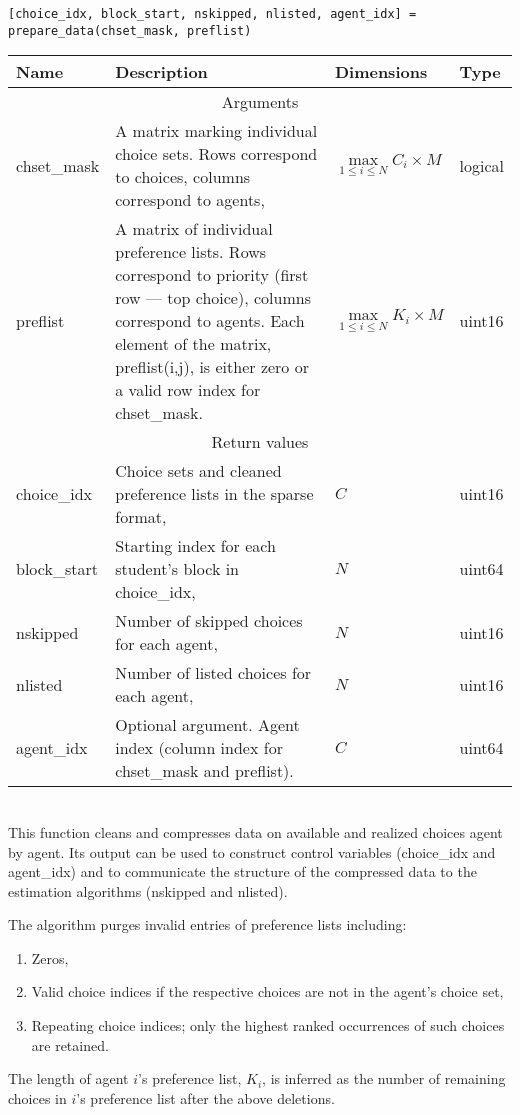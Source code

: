 \documentclass[12pt]{article}
\begin{document}
\texttt{[choice\_idx, block\_start, nskipped, nlisted, agent\_idx] = prepare\_data(chset\_mask, preflist)}

\begin{tabular}{lp{}ll}\\\hline\hline
	Name 		& Description & Dimensions & Type\\\hline
	
	\multicolumn{4}{c}{Arguments}\\\hline
	
	chset\_mask & A matrix marking individual choice sets. Rows correspond to choices, columns correspond to agents,  & $\max\limits_{1\leq i \leq N}C_i \times M$ & logical\\
	
	preflist    & A matrix of individual preference lists. Rows correspond to priority (first row --- top choice), columns correspond to agents. Each element of the matrix, preflist(i,j), is either zero or a valid row index for chset\_mask.  & $\max\limits_{1\leq i \leq N}K_i \times M$ & uint16\\\hline
	
	\multicolumn{4}{c}{Return values}\\\hline
	
	choice\_idx		& Choice sets and cleaned preference lists in the sparse format, & $C$ & uint16 \\
	block\_start & Starting index for each student's block in choice\_idx, & $N$ & uint64 \\
	nskipped & Number of skipped choices for each agent, & $N$ & uint16 \\
	nlisted & Number of listed choices for each agent, & $N$ & uint16 \\
	agent\_idx & Optional argument. Agent index (column index for chset\_mask and preflist). & $C$ & uint64 \\  \hline\hline
\end{tabular}\\

This function cleans and compresses data on available and realized choices agent by agent. Its output can be used to construct control variables (choice\_idx and agent\_idx) and to communicate the structure of the compressed data to the estimation algorithms (nskipped and nlisted).

The algorithm purges invalid entries of preference lists including:
\begin{enumerate}
	\item Zeros,
	\item Valid choice indices if the respective choices are not in the agent's choice set,
	\item Repeating choice indices; only the highest ranked occurrences of such choices are retained.
\end{enumerate}
The length of agent $i$'s preference list, $K_i$, is inferred as the number of remaining choices in $i$'s preference list after the above deletions.
\end{document}
